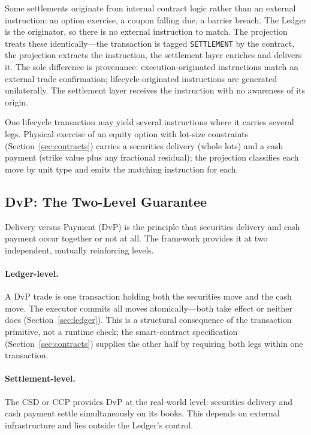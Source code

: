 Some settlements originate from internal contract logic rather than an external instruction: an option exercise, a coupon falling due, a barrier breach. The Ledger is the originator, so there is no external instruction to match. The projection treats these identically---the transaction is tagged \texttt{SETTLEMENT} by the contract, the projection extracts the instruction, the settlement layer enriches and delivers it. The sole difference is provenance: execution-originated instructions match an external trade confirmation; lifecycle-originated instructions are generated unilaterally. The settlement layer receives the instruction with no awareness of its origin.

One lifecycle transaction may yield several instructions where it carries several legs. Physical exercise of an equity option with lot-size constraints (Section~\ref{sec:contracts}) carries a securities delivery (whole lots) and a cash payment (strike value plus any fractional residual); the projection classifies each move by unit type and emits the matching instruction for each.

\subsection{DvP: The Two-Level Guarantee}
\label{sec:settlement-dvp}

Delivery versus Payment (DvP) is the principle that securities delivery and cash payment occur together or not at all. The framework provides it at two independent, mutually reinforcing levels.

\paragraph{Ledger-level.} A DvP trade is one transaction holding both the securities move and the cash move. The executor commits all moves atomically---both take effect or neither does (Section~\ref{sec:ledger}). This is a structural consequence of the transaction primitive, not a runtime check; the smart-contract specification (Section~\ref{sec:contracts}) supplies the other half by requiring both legs within one transaction.

\paragraph{Settlement-level.} The CSD or CCP provides DvP at the real-world level: securities delivery and cash payment settle simultaneously on its books. This depends on external infrastructure and lies outside the Ledger's control.

